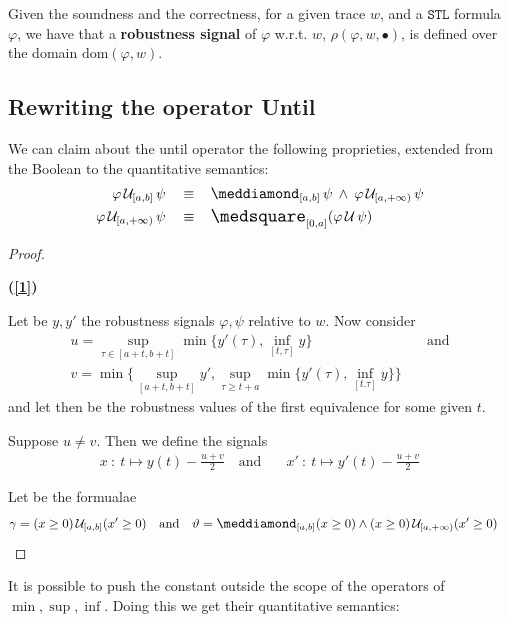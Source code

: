 \documentclass{suftesi}
\renewcommand{\b}{\textbf}
\newcommand{\STL}{$\mathtt{STL}$ }
\newcommand{\dom}[1]{\mathrm{dom}(#1 ,w)}
\begin{document}
Given the soundness and the correctness, for a given trace $w$, and a \STL formula $\varphi$, we have that a \b{robustness signal} of $\varphi$ w.r.t. $w$, $\rho(\varphi,w,\bullet)$, is defined over the domain $\dom{\varphi}$.

\subsection{Rewriting the operator Until}
We can claim about the until operator the following proprieties, extended from the Boolean to the quantitative semantics:
\begin{align}
    \varphi \,\mathcal{U}_{[a,b]}\,\psi\quad    \equiv  &\quad\pos_{[a,b]}\psi\:\land\:\varphi\,\mathcal{U}_{[a,+\infty)}\,\psi \label{1}\\
    \varphi\,\mathcal{U}_{[a,+\infty)}\,\psi\quad   \equiv  &\quad\nec_{[0,a]}(\varphi\,\mathcal{U}\,\psi)
\end{align}

\begin{proof} \textcolor{white}{---}

    \b{(\ref{1})}

    Let be $y,y'$ the robustness signals $\varphi, \psi$ relative to $w$. Now consider 
        \begin{align*}
            u=\sup_{\tau\in[a+t,b+t]}\min\biggl\{y'(\tau), \inf_{[t,\tau]}y\biggr\} &\quad \text{and}\\ v=\min\biggl\{\sup_{[a+t,b+t]}y',\sup_{\tau\geq t+a}\min\biggl\{y'(\tau),\inf_{[t.\tau]}y\biggr\}\biggr\}
        \end{align*}
    and let then be the robustness values of the first equivalence for some given $t$.

    Suppose $u\neq v$. Then we define the signals 
    \begin{align*}
        x\::\:t\mapsto y(t)-\frac{u+v}{2} \quad \text{and}  &\quad x'\::\:t\mapsto y'(t)-\frac{u+v}{2}
    \end{align*}

    Let be the formualae
    \begin{align*}
        \gamma=(x\geq0)\,\mathcal{U}_{[a,b]}(x'\geq 0) \quad \text{and}  &\quad \vartheta = \pos_{[a,b]} (x\geq0)\land(x\geq0)\,\mathcal{U}_{[a,+\infty)}(x'\geq 0)
    \end{align*}
\end{proof}
It is possible to push the constant outside the scope of the operators of $\min, \sup,\inf$. Doing this we get their quantitative semantics:
\end{document}
